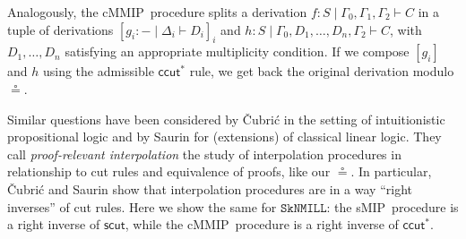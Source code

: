 \documentclass[sn-mathphys-num]{sn-jnl}%
\newcommand{\GG}{\Gamma}
\newcommand{\GD}{\Delta}
\newcommand{\vd}{\vdash}
\newcommand{\SkNMILL}{$\mathtt{SkNMILL}$}
\newcommand{\mf}[1]{\mathsf{#1}}
\newcommand{\sMIP}{\textsf{sMIP}}
\newcommand{\cMMIP}{\textsf{cMMIP}}
\theoremstyle{thmstyleone}%
\theoremstyle{thmstyletwo}%
\theoremstyle{thmstylethree}%
\begin{document}
Analogously, the \cMMIP~procedure splits a derivation $f : S \mid \GG_0,\GG_1,\GG_2 \vd C$ in a tuple of derivations $[g_i : {-} \mid \GD_i \vd D_i]_i$ and $h : S \mid \GG_0,D_1,\dots,D_n,\GG_2 \vd C$, with $D_1,\dots,D_n$ satisfying an appropriate multiplicity condition.
If we compose $[g_i]$ and $h$ using the admissible $\mathsf{ccut^*}$ rule, we get back the original derivation modulo $\circeq$.

Similar questions have been considered by {\v{C}}ubri{\'c} \cite{Cubric1994} in the setting of intuitionistic propositional logic and by Saurin \cite{Saurin2024} for (extensions) of classical linear logic.
They call \emph{proof-relevant interpolation} the study of interpolation procedures in relationship to cut rules and equivalence of proofs, like our $\circeq$.
In particular, {\v{C}}ubri{\'c} and Saurin show that interpolation procedures are in a way ``right inverses'' of cut rules.
Here we show the same for \SkNMILL: the \sMIP~procedure is a right inverse of $\mf{scut}$, while the \cMMIP~procedure is a right inverse of $\mathsf{ccut^*}$. 
\end{document}
